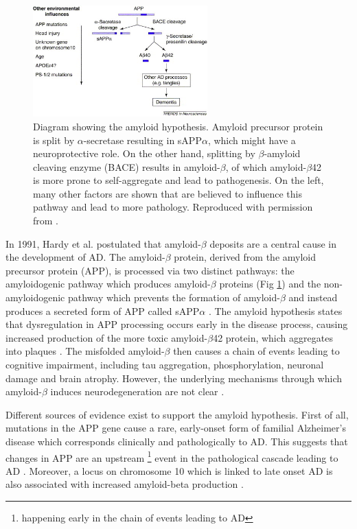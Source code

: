 \begin{figure}
\centering
\includegraphics[width=0.6\textwidth]{images/amyloid_hypothesis}
\caption[Diagram showing the amyloid hypothesis]{Diagram showing the amyloid hypothesis. Amyloid precursor protein is split by $\alpha$-secretase resulting in sAPP$\alpha$, which might have a neuroprotective role. On the other hand, splitting by $\beta$-amyloid cleaving enzyme (BACE) results in amyloid-$\beta$, of which amyloid-$\beta$42 is more prone to self-aggregate and lead to pathogenesis. On the left, many other factors are shown that are believed to influence this pathway and lead to more pathology. Reproduced with permission from \cite{mudher2002alzheimer}.}
\label{fig:bckAmyloidHypothesis}
\end{figure}

In 1991, Hardy et al. \cite{hardy1991amyloid} postulated that amyloid-$\beta$ deposits are a central cause in the development of AD. The amyloid-$\beta$ protein, derived from the amyloid precursor protein (APP), is processed via two distinct pathways: the amyloidogenic pathway which produces amyloid-$\beta$ proteins (Fig \ref{fig:bckAmyloidHypothesis}) and the non-amyloidogenic pathway which prevents the formation of amyloid-$\beta$ and instead produces a secreted form of APP called sAPP$\alpha$ \cite{mudher2002alzheimer}. The amyloid hypothesis states that dysregulation in APP processing occurs early in the disease process, causing increased production of the more toxic amyloid-$\beta$42 protein, which aggregates into plaques \cite{mudher2002alzheimer}. The misfolded amyloid-$\beta$ then causes a chain of events leading to cognitive impairment, including tau aggregation, phosphorylation, neuronal damage and brain atrophy. However, the underlying mechanisms through which amyloid-$\beta$ induces neurodegeneration are not clear \cite{mudher2002alzheimer}. 

Different sources of evidence exist to support the amyloid hypothesis. First of all, mutations in the APP gene cause a rare, early-onset form of familial Alzheimer's disease which corresponds clinically and pathologically to AD. This suggests that changes in APP are an upstream \footnote{happening early in the chain of events leading to AD} event in the pathological cascade leading to AD \cite{mudher2002alzheimer}. Moreover, a locus on chromosome 10 which is linked to late onset AD is also associated with increased amyloid-beta production \cite{ertekin2000linkage}. 


